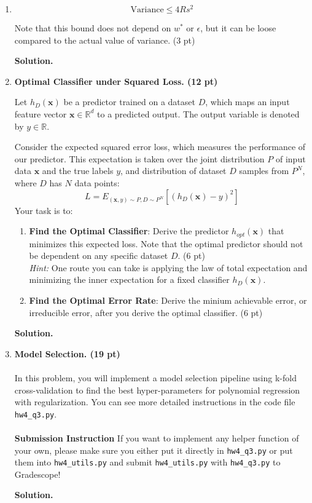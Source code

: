 \documentclass{article}
\theoremstyle{definition}
\theoremstyle{remark}
\newenvironment{Q}
    {%
      \clearpage
      \item
    }
    {%
      \phantom{s}
      \bigskip
      \textbf{Solution.}
    }
\begin{document}
\begin{enumerate}[font={\Large\bfseries},left=0pt]
\begin{Q}
\begin{enumerate}
			      $$
				      \text{Variance} \leq 4Rs^2
			      $$

			      Note that this bound does not depend on $w^*$ or $\epsilon$, but it can be loose compared to the actual value of variance. (3 pt)
		\end{enumerate}

	\end{Q}

	\begin{Q}
		\textbf{\Large Optimal Classifier under Squared Loss. \textbf{(12 pt)}}

		Let $h_D(\boldsymbol{x})$ be a predictor trained on a dataset $D$, which maps an input feature vector $\boldsymbol{x}\in \mathbb{R}^d$ to a predicted output. The output variable is denoted by $y\in\mathbb{R}$.

		Consider the expected squared error loss, which measures the performance of our predictor. This expectation is taken over the joint distribution $P$ of input data $\boldsymbol{x}$ and the true labels $y$, and distribution of dataset $D$ samples from $P^N$, where $D$ has $N$ data points:
		$$L = E_{(\boldsymbol{x}, y)\sim P, D\sim P^N}\left[(h_D(\boldsymbol{x}) - y)^2\right]$$
		Your task is to:
		\begin{enumerate}
			\item \textbf{Find the Optimal Classifier}: Derive the predictor $h_{opt}(\boldsymbol{x})$ that minimizes this expected loss. Note that the optimal predictor should not be dependent on any specific dataset $D$. (6 pt) \\
			      \textit{Hint:} One route you can take is applying the law of total expectation and minimizing the inner expectation for a fixed classifier $h_D(\boldsymbol{x})$.
			\item \textbf{Find the Optimal Error Rate}: Derive the minium achievable error, or irreducible error, after you derive the optimal classifier. (6 pt)
		\end{enumerate}
	\end{Q}

	\begin{Q}
		\textbf{\Large Model Selection. \textbf{(19 pt)}}
		\\ \\ In this problem, you will implement a  model selection pipeline using k-fold cross-validation to find the best hyper-parameters for polynomial regression with regularization. You can see more detailed instructions in the code file \texttt{hw4\_q3.py}. \\ \\
		\textbf{Submission Instruction} If you want to implement any helper function of your own, please make sure you either put it directly in \texttt{hw4\_q3.py} or put them into \texttt{hw4\_utils.py} and submit \texttt{hw4\_utils.py} with \texttt{hw4\_q3.py} to Gradescope!


\end{Q}
\end{enumerate}
\end{document}
